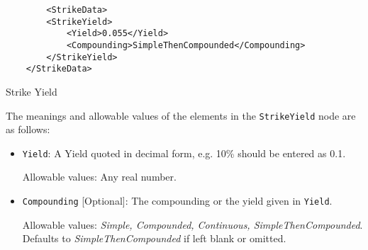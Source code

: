\begin{listing}[H]
\begin{verbatim}
        <StrikeData>
		<StrikeYield>
			<Yield>0.055</Yield>
			<Compounding>SimpleThenCompounded</Compounding>
		</StrikeYield>
	</StrikeData>
\end{verbatim}
\caption{Strike Yield}
\label{lst:strikeyield}
\end{listing}

The meanings and allowable values of the elements in the \lstinline!StrikeYield! node are as follows:

\begin{itemize}

\item \lstinline!Yield!: A Yield quoted in decimal form, e.g. 10\% should be entered as 0.1.

Allowable values: Any real number.

\item \lstinline!Compounding! [Optional]: The compounding or the yield given in  \lstinline!Yield!. 

Allowable values: {\em Simple, Compounded, Continuous, SimpleThenCompounded}. Defaults to \emph{SimpleThenCompounded} if left blank or omitted.

\end{itemize}

